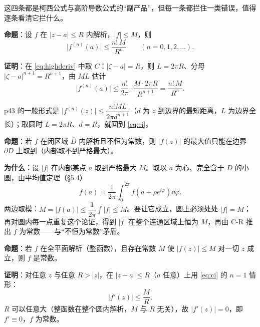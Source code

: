 \documentclass[11pt]{ctexart}
\let\origsubhdr\subhdr
\renewcommand{\subhdr}[1]{\par\needspace{4\baselineskip}\origsubhdr{#1}}
\let\orighdr\hdr
\renewcommand{\hdr}[2]{\par\needspace{9\baselineskip}\orighdr{#1}{#2}}
\begin{document}

这四条都是柯西公式与高阶导数公式的“副产品”，但每一条都拦住一类错误，值得逐条看清它拦什么。


\textbf{命题}：设 $f$ 在 $|z-a|\le R$ 内解析，$|f|\le M$，则
\begin{equation}\label{eq:ci}
\bigl|f^{(n)}(a)\bigr|\le\frac{n!\,M}{R^{n}}\qquad(n=0,1,2,\dots).
\end{equation}

\textbf{证明}：在 \eqref{eq:highderiv} 中取 $C$：$|\zeta-a|=R$，则 $L=2\pi R$、分母 $|\zeta-a|^{n+1}=R^{n+1}$，由 $ML$ 估计
\[ \bigl|f^{(n)}(a)\bigr|\le\frac{n!}{2\pi}\cdot\frac{M\cdot2\pi R}{R^{n+1}}=\frac{n!\,M}{R^{n}} . \]

p43 的一般形式是 $\bigl|f^{(n)}(z)\bigr|\le\dfrac{n!ML}{2\pi d^{n+1}}$（$d$ 为 $z$ 到边界的最短距离，$L$ 为边界全长）；取圆时 $L=2\pi R$、$d=R$，就回到 \eqref{eq:ci}。



\textbf{命题}：若 $f$ 在闭区域 $\overline{D}$ 内解析且不恒为常数，则 $|f(z)|$ 的最大值只能在边界 $\partial D$ 上取到（内部取不到严格最大）。

\textbf{为什么}：设 $|f|$ 在内部某点 $a$ 取到严格最大 $M$。取以 $a$ 为心、完全含于 $D$ 的小圆，由平均值定理（§5.4）
\[ f(a)=\frac{1}{2\pi}\int_0^{2\pi}f(a+\rho e^{i\varphi})\dd\varphi . \]
两边取模：$M=|f(a)|\le\dfrac{1}{2\pi}\int|f|\le M$。要让它成立，圆上必须处处 $|f|=M$；再对圆内每一点重复这个论证，得到 $|f|$ 在整个连通区域上恒为 $M$，再由 C-R 推出 $f$ 为常数——与“不恒为常数”矛盾。



\textbf{命题}：若 $f$ 在全平面解析（整函数），且存在常数 $M$ 使 $|f(z)|\le M$ 对一切 $z$ 成立，则 $f$ 是常数。

\textbf{证明}：对任意 $z$ 与任意 $R>|z|$，在 $|z-a|\le R$（$a$ 任意）上用 \eqref{eq:ci} 的 $n=1$ 情形：
\[ |f'(z)|\le\frac{M}{R} . \]
$R$ 可以任意大（整函数在整个圆内解析，$M$ 与 $R$ 无关），故 $|f'(z)|=0$，即 $f'\equiv0$，$f$ 为常数。
\end{document}
